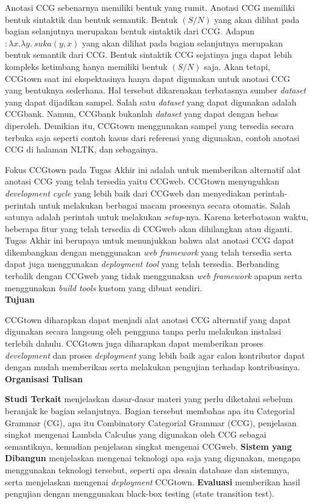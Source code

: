 Anotasi CCG sebenarnya memiliki bentuk yang rumit. Anotasi CCG memiliki bentuk sintaktik dan
bentuk semantik. Bentuk $(S/N)$ yang akan dilihat pada bagian selanjutnya merupakan bentuk sintaktik
dari CCG\citep{Lambek1988}. Adapun $: \lambda x.\lambda y.\ suka(y, x)$ yang akan dilihat pada bagian
selanjutnya merupakan bentuk semantik dari CCG. Bentuk sintaktik CCG sejatinya juga dapat lebih
kompleks ketimbang hanya memiliki bentuk $(S/N)$ saja. Akan tetapi, CCGtown saat ini ekspektasinya
hanya dapat digunakan untuk anotasi CCG yang bentuknya sederhana. Hal tersebut dikarenakan terbatasnya
sumber \textit{dataset} yang dapat dijadikan sampel. Salah satu \textit{dataset} yang dapat digunakan
adalah CCGbank. Namun, CCGbank bukanlah \textit{dataset} yang dapat dengan bebas diperoleh.
Demikian itu, CCGtown menggunakan sampel yang tersedia secara terbuka saja seperti contoh kasus
dari referensi yang digunakan, contoh anotasi CCG di halaman NLTK, dan sebagainya.

Fokus CCGtown pada Tugas Akhir ini adalah untuk memberikan alternatif alat anotasi CCG yang telah
tersedia yaitu CCGweb. CCGtown menyuguhkan \textit{development cycle} yang lebih baik dari CCGweb
dan menyediakan perintah-perintah untuk melakukan berbagai macam prosesnya secara otomatis.
Salah satunya adalah perintah untuk melakukan \textit{setup}-nya. Karena keterbatasan waktu,
beberapa fitur yang telah tersedia di CCGweb akan dihilangkan atau diganti. Tugas Akhir ini
berupaya untuk menunjukkan bahwa alat anotasi CCG dapat dikembangkan dengan menggunakan
\textit{web framework} yang telah tersedia serta dapat juga menggunakan \textit{deployment tool}
yang telah tersedia. Berbanding terbalik dengan CCGweb yang tidak menggunakan \textit{web framework}
apapun serta menggunakan \textit{build tools} kustom yang dibuat sendiri.
\\


\noindent\textbf{Tujuan}

CCGtown diharapkan dapat menjadi alat anotasi CCG alternatif yang dapat digunakan secara langsung
oleh pengguna tanpa perlu melakukan instalasi terlebih dahulu. CCGtown juga diharapkan dapat
memberikan proses \textit{development} dan proses \textit{deployment} yang lebih baik agar calon
kontributor dapat dengan mudah memberikan serta melakukan pengujian terhadap kontribusinya.
\\


\noindent \textbf{Organisasi Tulisan}

\textbf{Studi Terkait} menjelaskan dasar-dasar materi yang perlu diketahui sebelum beranjak ke bagian
selanjutnya. Bagian tersebut membahas apa itu Categorial Grammar (CG), apa itu Combinatory
Categorial Grammar (CCG), penjelasan singkat mengenai Lambda Calculus yang digunakan oleh CCG sebagai
semantiknya, kemudian penjelasan singkat mengenai CCGweb.
\textbf{Sistem yang Dibangun} menjelaskan mengenai teknologi apa saja yang digunakan, mengapa
menggunakan teknologi tersebut, seperti apa desain database dan sistemnya, serta
menjelaskan mengenai \textit{deployment} CCGtown.
\textbf{Evaluasi} memberikan hasil pengujian dengan menggunakan black-box testing
(state transition test).



